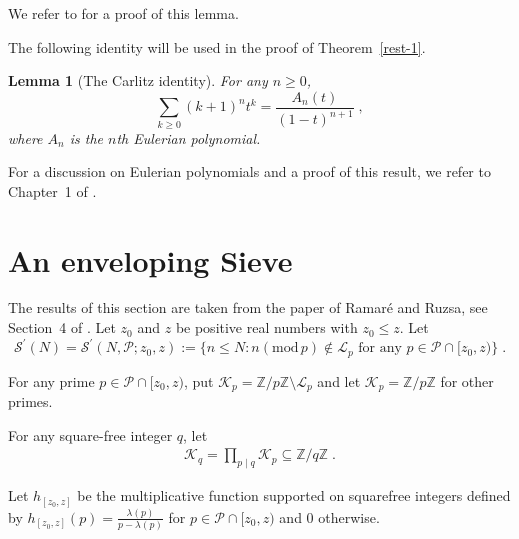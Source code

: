 \documentclass[12pt,article]{amsart}
\newtheorem{lemma}[theorem]{Lemma}
\theoremstyle{remark}
\numberwithin{equation}{section}
\renewcommand{\pmod}[1]{\left(\mathrm{mod}\,#1\right)}
\begin{document}
	\noindent
	We refer to \cite{Montgomery} for a proof of this lemma.
	
	
	\vspace{2mm}
	\noindent
	The following identity will be used in the proof of Theorem~\ref{rest-1}.
	\begin{lemma}[The Carlitz identity]
		\label{Carlitz}
		For any $n\geq 0$,
		\[
		\sum_{k\geq 0}(k+1)^nt^k=\frac{A_n(t)}{(1-t)^{n+1}}\; ,
		\]
		where $A_n$ is the $n$th Eulerian polynomial. 
	\end{lemma}
	\noindent
	For a discussion on Eulerian polynomials and a proof of this result, we refer to Chapter~1 of \cite{Petersen}.
	
	\section{An enveloping Sieve}\label{envsieve}
	\vspace{2mm}
	\noindent
	The results of this section are taken from the paper of Ramar\'e and Ruzsa, see Section~4 of \cite{Ramare-ruzsa}.
	Let $z_0 $ and $z$ be positive real numbers with $z_0\leq z$. Let
	\[\mathcal{S}^{\prime}(N)=\mathcal{S}^{\prime}(N, \mathcal{P}; z_0,z):=\{n\leq N: n\pmod p \notin \mathcal{L}_p \text{ for any } p\in \mathcal{P}\cap [z_0,z)\}\;.\] 
	
	\vspace{2mm}
	\noindent
	For any prime $p\in \mathcal{P}\cap [z_0,z)$, put $\mathcal{K}_p=\mathbb{Z}/p\mathbb{Z}\setminus\mathcal{L}_p$ and let $\mathcal{K}_p=\mathbb{Z}/p\mathbb{Z}$ for other primes.
	
	\vspace{2mm}
	\noindent
	For any square-free integer $q$, let 
	\begin{align}\label{K_q def}
		\mathcal{K}_q=\prod_{p\mid q}\mathcal{K}_p\subseteq \mathbb{Z}/q\mathbb{Z}\;.
	\end{align}
	
	\vspace{2mm}
	\noindent
	Let $h_{[z_0,z]}$ be the multiplicative function supported on squarefree integers defined by $h_{[z_0,z]}(p)=\frac{\lambda(p)}{p-\lambda(p)}$ for $p\in \mathcal{P}\cap[z_0,z)$ and $0$ otherwise. 
	
\end{document}

